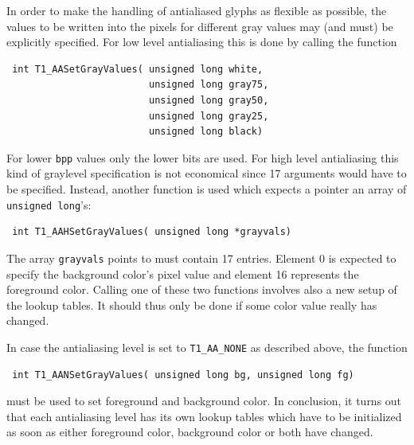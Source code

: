 In order to make the handling of antialiased glyphs as flexible as possible,
the values to be written into the pixels for different gray values
may (and must) be explicitly specified. For low level antialiasing this is
done by calling the function
\precorr
\begin{verbatim}
 int T1_AASetGrayValues( unsigned long white,
                         unsigned long gray75,
                         unsigned long gray50,
                         unsigned long gray25,
                         unsigned long black)
\end{verbatim}\postcorr
For lower \verb+bpp+ values only the lower bits are used. For high level
antialiasing this kind of graylevel specification is not economical since 17
arguments 
would have to be specified. Instead, another function is used which expects a
pointer an array of \verb+unsigned long+'s:
\precorr
\begin{verbatim}
 int T1_AAHSetGrayValues( unsigned long *grayvals)
\end{verbatim}\postcorr
The array \verb+grayvals+ points to must contain 17 entries. Element 0 is
expected to specify the background color's pixel value and element 16
represents the foreground color. Calling one of these two functions involves
also a new setup of the lookup tables. It should thus only be done if some
color value really has changed. 

In case the antialiasing level is set to \verb+T1_AA_NONE+ as described 
above, the function
\precorr
\begin{verbatim}
 int T1_AANSetGrayValues( unsigned long bg, unsigned long fg)
\end{verbatim}\postcorr
must be used to set foreground and background color. In conclusion, it turns
out that each antialiasing level has its own lookup tables which have to be
initialized as soon as either foreground color, background color or both have
changed. 
 
